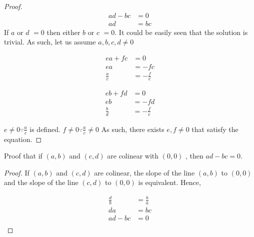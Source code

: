 \documentclass[answers]{exam}
\begin{document}
\begin{questions}
\begin{parts}
\begin{solution}
\begin{proof}
\begin{align*}
ad-bc &= 0 \\
ad &= bc
\end{align*}
If $a$ or $d$ $= 0$ then either $b$ or $c$ $= 0$. It could be easily seen that the solution is trivial. As such, let us assume \(a,b,c,d \neq 0\)

\begin{align*}
ea+fc &= 0 \\
ea &= -fc\\ 
\frac{a}{c} &= -\frac{f}{e}
\end{align*}

\begin{align*}
eb+fd &= 0 \\
eb &= -fd\\ 
\frac{b}{d} &= -\frac{f}{e}
\end{align*}

$ e \neq 0 \because \frac{a}{c} $ is defined.  \(f \neq 0 \because \frac{a}{c} \neq 0\) As such, there exists $e,f\neq 0$ that satisfy the equation.

\end{proof}
\end{solution}



\bonuspart[\half] Proof that if \((a,b)\) and \((c,d)\) are colinear with \( (0,0) \) , then \(ad - bc = 0\). \\

\begin{solution}
\begin{proof}
If \((a,b)\) and \((c,d)\) are colinear, the slope of the line $(a,b)$ to $(0,0)$ and the slope of the line $(c,d)$ to $(0,0)$ is equivalent. Hence,

\begin{align*}
    \frac{d}{b} &= \frac{b}{a} \\
    da &= bc \\
    ad - bc &= 0 \\
\end{align*}

\end{proof}
\end{solution}



\end{parts}


\end{questions}
\end{document}
